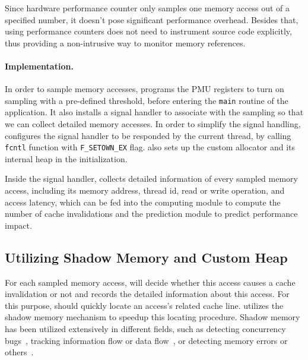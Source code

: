 Since hardware performance counter only samples one memory access out of a specified number, it doesn't pose significant performance overhead. Besides that, using performance counters does not need to instrument source code explicitly, thus providing a non-intrusive way to monitor memory references. 

\paragraph{Implementation.} 

In order to sample memory accesses, \cheetah{} programs the PMU registers to turn on sampling with a pre-defined threshold, before entering the \texttt{main} routine of the application. It also installs a signal handler to associate with the sampling so that we can collect detailed memory accesses. In order to simplify the signal handling, \Cheetah{} configures the signal handler to be responded by the current thread, by calling \texttt{fcntl} function with \texttt{F\_SETOWN\_EX} flag. \cheetah{} also sets up the custom allocator and its internal heap in the initialization.

Inside the signal handler, \Cheetah{} collects detailed information of every sampled memory access, including its memory address, thread id, read or write operation, and access latency, which can be fed into the computing module to compute the number of cache invalidations and the prediction module to predict performance impact.

\subsection{Utilizing Shadow Memory and Custom Heap}
\label{sec:shadow}

For each sampled memory access, \cheetah{} will decide whether this access causes a cache invalidation or not and records the detailed information about this access. For this purpose, \cheetah{} should quickly locate an access's related cache line. \Cheetah{} utilizes the shadow memory mechanism to speedup this locating procedure.
Shadow memory has been utilized extensively in different fields, such as detecting concurrency bugs~\cite{Harrow:2000:RCM:645880.672080, helgrind, 404681, Savage:1997:EDD:268998.266641}, tracking information flow or data flow~\cite{Cheng:2006:TEF:1157733.1157903, Newsome05dynamictaint, Qin:2006:LLP:1194816.1194834}, or detecting memory errors or others~\cite{qinzhao, Hastings91purify:fast, Seward:2005:UVD:1247360.1247362, Narayanasamy:2006:ALO:1140277.1140303}.  

